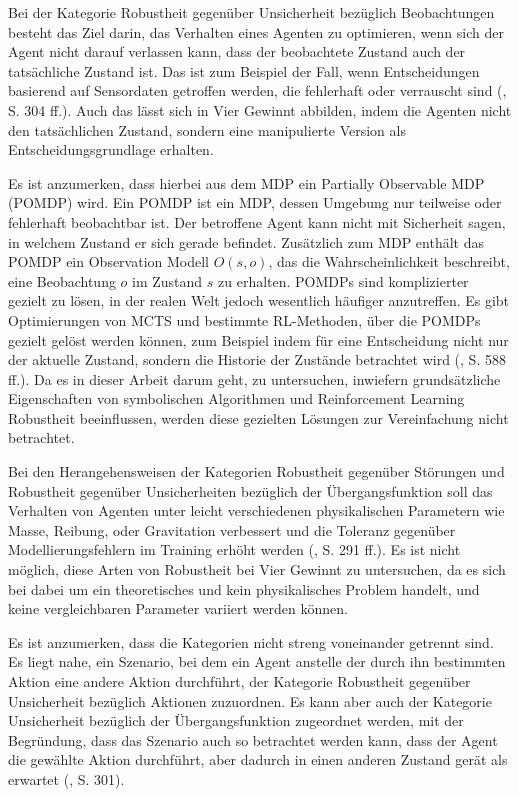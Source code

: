 Bei der Kategorie Robustheit gegenüber Unsicherheit bezüglich Beobachtungen besteht das Ziel darin, das Verhalten eines Agenten zu optimieren, wenn sich der Agent nicht darauf verlassen kann, dass der beobachtete Zustand auch der tatsächliche Zustand ist. Das ist zum Beispiel der Fall, wenn Entscheidungen basierend auf Sensordaten getroffen werden, die fehlerhaft oder verrauscht sind (\cite{Moos.2022}, S. 304 ff.). Auch das lässt sich in Vier Gewinnt abbilden, indem die Agenten nicht den tatsächlichen Zustand, sondern eine manipulierte Version als Entscheidungsgrundlage erhalten.

Es ist anzumerken, dass hierbei aus dem MDP ein Partially Observable MDP (POMDP) wird. Ein POMDP ist ein MDP, dessen Umgebung nur teilweise oder fehlerhaft beobachtbar ist. Der betroffene Agent kann nicht mit Sicherheit sagen, in welchem Zustand er sich gerade befindet. Zusätzlich zum MDP enthält das POMDP ein Observation Modell $O(s, o)$, das die Wahrscheinlichkeit beschreibt, eine Beobachtung $o$ im Zustand $s$ zu erhalten. POMDPs sind komplizierter gezielt zu lösen, in der realen Welt jedoch wesentlich häufiger anzutreffen. Es gibt Optimierungen von MCTS und bestimmte RL-Methoden, über die POMDPs gezielt gelöst werden können, zum Beispiel indem für eine Entscheidung nicht nur der aktuelle Zustand, sondern die Historie der Zustände betrachtet wird (\cite{Russell.2020}, S. 588 ff.). Da es in dieser Arbeit darum geht, zu untersuchen, inwiefern grundsätzliche Eigenschaften von symbolischen Algorithmen und Reinforcement Learning Robustheit beeinflussen, werden diese gezielten Lösungen zur Vereinfachung nicht betrachtet.

Bei den Herangehensweisen der Kategorien Robustheit gegenüber Störungen und Robustheit gegenüber Unsicherheiten bezüglich der Übergangsfunktion soll das Verhalten von Agenten unter leicht verschiedenen physikalischen Parametern wie Masse, Reibung, oder Gravitation verbessert und die Toleranz gegenüber Modellierungsfehlern im Training erhöht werden (\cite{Moos.2022}, S. 291 ff.). Es ist nicht möglich, diese Arten von Robustheit bei Vier Gewinnt zu untersuchen, da es sich bei dabei um ein theoretisches und kein physikalisches Problem handelt, und keine vergleichbaren Parameter variiert werden können.

Es ist anzumerken, dass die Kategorien nicht streng voneinander getrennt sind. Es liegt nahe, ein Szenario, bei dem ein Agent anstelle der durch ihn bestimmten Aktion eine andere Aktion durchführt, der Kategorie Robustheit gegenüber Unsicherheit bezüglich Aktionen zuzuordnen. Es kann aber auch der Kategorie Unsicherheit bezüglich der Übergangsfunktion zugeordnet werden, mit der Begründung, dass das Szenario auch so betrachtet werden kann, dass der Agent die gewählte Aktion durchführt, aber dadurch in einen anderen Zustand gerät als erwartet (\cite{Moos.2022}, S. 301).

